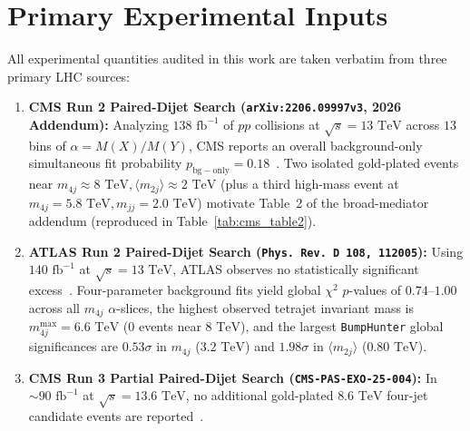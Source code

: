 \documentclass[11pt,a4paper]{article}
\begin{document}
\section{Primary Experimental Inputs}
All experimental quantities audited in this work are taken verbatim from three primary LHC sources:
\begin{enumerate}
\item \textbf{CMS Run 2 Paired-Dijet Search (\texttt{arXiv:2206.09997v3}, 2026 Addendum):} Analyzing $138\text{ fb}^{-1}$ of $pp$ collisions at $\sqrt{s} = 13\text{ TeV}$ across $13$ bins of $\alpha = M(X)/M(Y)$, CMS reports an overall background-only simultaneous fit probability $p_{\mathrm{bg-only}} = 0.18$~\cite{cms2023dijet}. Two isolated gold-plated events near $m_{4j} \approx 8\text{ TeV}, \langle m_{2j}\rangle \approx 2\text{ TeV}$ (plus a third high-mass event at $m_{4j} = 5.8\text{ TeV}, m_{jj} = 2.0\text{ TeV}$) motivate Table~2 of the broad-mediator addendum (reproduced in Table~\ref{tab:cms_table2}).
\item \textbf{ATLAS Run 2 Paired-Dijet Search (\texttt{Phys.\ Rev.\ D 108, 112005}):} Using $140\text{ fb}^{-1}$ at $\sqrt{s} = 13\text{ TeV}$, ATLAS observes no statistically significant excess~\cite{atlas2023dijet}. Four-parameter background fits yield global $\chi^2$ $p$-values of $0.74\text{--}1.00$ across all $m_{4j}$ $\alpha$-slices, the highest observed tetrajet invariant mass is $m_{4j}^{\max} = 6.6\text{ TeV}$ ($0$ events near $8\text{ TeV}$), and the largest \texttt{BumpHunter} global significances are $0.53\sigma$ in $m_{4j}$ ($3.2\text{ TeV}$) and $1.98\sigma$ in $\langle m_{2j}\rangle$ ($0.80\text{ TeV}$).
\item \textbf{CMS Run 3 Partial Paired-Dijet Search (\texttt{CMS-PAS-EXO-25-004}):} In $\sim 90\text{ fb}^{-1}$ at $\sqrt{s} = 13.6\text{ TeV}$, no additional gold-plated $8.6\text{ TeV}$ four-jet candidate events are reported~\cite{cms_run3_exo25004,leyaouanc2026gluon}.
\end{enumerate}
\end{document}
